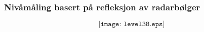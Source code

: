 \documentclass[aspectratio=169,xcolor=dvipsnames]{beamer}
\begin{document}
%
%
%
\begin{frame}
	\frametitle{Nivåmåling basert på refleksjon av radarbølger}

$$\texttt{[image: level38.eps]}$$
\end{frame}
%
\end{document}
